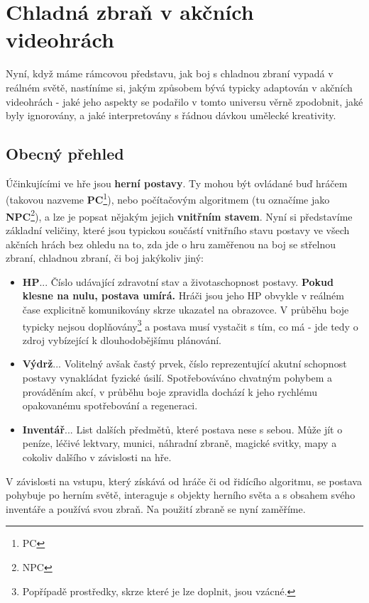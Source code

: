 \section{Chladná zbraň v akčních videohrách}

Nyní, když máme rámcovou představu, jak boj s chladnou zbraní vypadá v reálném světě, nastíníme si, jakým způsobem bývá typicky adaptován v akčních videohrách - jaké jeho aspekty se podařilo v tomto universu věrně zpodobnit, jaké byly ignorovány, a jaké interpretovány s řádnou dávkou umělecké kreativity.

\subsection{Obecný přehled}

Účinkujícími ve hře jsou \textbf{herní postavy}. Ty mohou být ovládané buď hráčem (takovou nazveme \textbf{\acs{PC}}\footnote{\Acl{PC}}), nebo počítačovým algoritmem (tu označíme jako \textbf{\acs{NPC}}\footnote{\Acl{NPC}}), a lze je popsat nějakým jejich \textbf{vnitřním stavem}. Nyní si představíme základní veličiny, které jsou typickou součástí vnitřního stavu postavy ve všech akčních hrách bez ohledu na to, zda jde o hru zaměřenou na boj se střelnou zbraní, chladnou zbraní, či boj jakýkoliv jiný:

\begin{itemize}
    \item \textbf{\ac{HP}}... Číslo udávající zdravotní stav a životaschopnost postavy. \textbf{Pokud klesne na nulu, postava umírá.} Hráči jsou jeho HP obvykle v reálném čase explicitně komunikovány skrze ukazatel na obrazovce. V průběhu boje typicky nejsou doplňovány\footnote{Popřípadě prostředky, skrze které je lze doplnit, jsou vzácné.} a postava musí vystačit s tím, co má - jde tedy o zdroj vybízející k dlouhodobějšímu plánování.
    \item \textbf{Výdrž}... Volitelný avšak častý prvek, číslo reprezentující akutní schopnost postavy vynakládat fyzické úsilí. Spotřebováváno chvatným pohybem a prováděním akcí, v průběhu boje zpravidla dochází k jeho rychlému opakovanému spotřebování a regeneraci.
    \item \textbf{Inventář}... List dalších předmětů, které postava nese s sebou. Může jít o peníze, léčivé lektvary, munici, náhradní zbraně, magické svitky, mapy a cokoliv dalšího v závislosti na hře. 
\end{itemize}

V závislosti na vstupu, který získává od hráče či od řidícího algoritmu, se postava pohybuje po herním světě, interaguje s objekty herního světa a s obsahem svého inventáře a používá svou zbraň. Na použití zbraně se nyní zaměříme.

